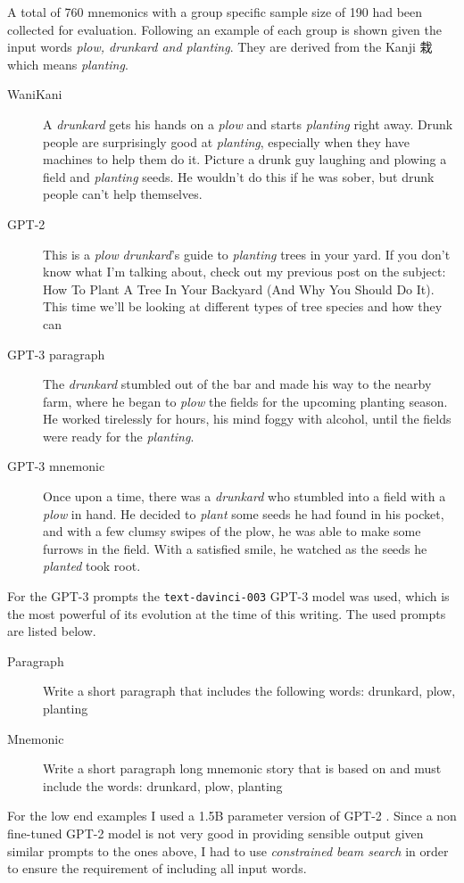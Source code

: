 A total of 760 mnemonics with a group specific sample size of 190 had been collected for evaluation. Following an example of each group is shown given the input words \emph{plow, drunkard and planting}. They are derived from the Kanji 栽 which means \emph{planting}.
\begin{description}
    \item[WaniKani] A \emph{drunkard} gets his hands on a \emph{plow} and starts \emph{planting} right away. Drunk people are surprisingly good at \emph{planting}, especially when they have machines to help them do it. Picture a drunk guy laughing and plowing a field and \emph{planting} seeds. He wouldn't do this if he was sober, but drunk people can't help themselves.
    \item[GPT-2]  This is a \emph{plow} \emph{drunkard}'s guide to \emph{planting} trees in your yard. If you don't know what I'm talking about, check out my previous post on the subject: How To Plant A Tree In Your Backyard (And Why You Should Do It). This time we'll be looking at different types of tree species and how they can
    \item[GPT-3 paragraph] The \emph{drunkard} stumbled out of the bar and made his way to the nearby farm, where he began to \emph{plow} the fields for the upcoming planting season. He worked tirelessly for hours, his mind foggy with alcohol, until the fields were ready for the \emph{planting}.
    \item[GPT-3 mnemonic] Once upon a time, there was a \emph{drunkard} who stumbled into a field with a \emph{plow} in hand. He decided to \emph{plant} some seeds he had found in his pocket, and with a few clumsy swipes of the plow, he was able to make some furrows in the field. With a satisfied smile, he watched as the seeds he \emph{planted} took root. 
\end{description}
For the GPT-3 prompts the \texttt{text-davinci-003} GPT-3 model was used, which is the most powerful of its evolution at the time of this writing. The used prompts are listed below.
\begin{description}
    \item[Paragraph] Write a short paragraph that includes the following words: drunkard, plow, planting
    \item[Mnemonic] Write a short paragraph long mnemonic story that is based on and must include the words: drunkard, plow, planting
\end{description}

For the low end examples I used a 1.5B parameter version of GPT-2 \cite{radford2019language}. Since a non fine-tuned GPT-2 model is not very good in providing sensible output given similar prompts to the ones above, I had to use \emph{constrained beam search} in order to ensure the requirement of including all input words.

